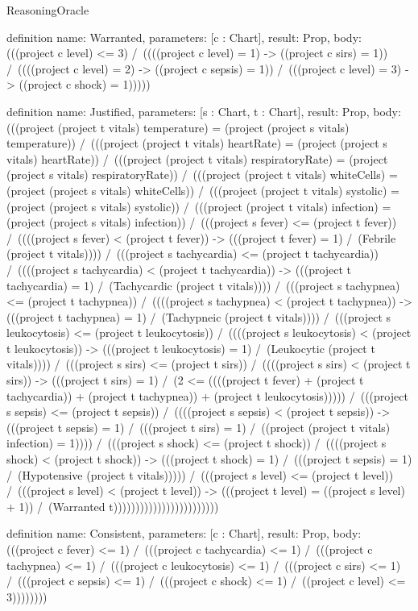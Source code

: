 \begin{lexlean}{ReasoningOracle}
\begin{semanticmodule}
definition{
  name: Warranted,
  parameters: [c : Chart],
  result: Prop,
  body: (((project c level) <= 3) /\ ((((project c level) = 1) -> ((project c sirs) = 1)) /\ ((((project c level) = 2) -> ((project c sepsis) = 1)) /\ (((project c level) = 3) -> ((project c shock) = 1)))))
}

definition{
  name: Justified,
  parameters: [s : Chart, t : Chart],
  result: Prop,
  body: (((project (project t vitals) temperature) = (project (project s vitals) temperature)) /\ (((project (project t vitals) heartRate) = (project (project s vitals) heartRate)) /\ (((project (project t vitals) respiratoryRate) = (project (project s vitals) respiratoryRate)) /\ (((project (project t vitals) whiteCells) = (project (project s vitals) whiteCells)) /\ (((project (project t vitals) systolic) = (project (project s vitals) systolic)) /\ (((project (project t vitals) infection) = (project (project s vitals) infection)) /\ (((project s fever) <= (project t fever)) /\ ((((project s fever) < (project t fever)) -> (((project t fever) = 1) /\ (Febrile (project t vitals)))) /\ (((project s tachycardia) <= (project t tachycardia)) /\ ((((project s tachycardia) < (project t tachycardia)) -> (((project t tachycardia) = 1) /\ (Tachycardic (project t vitals)))) /\ (((project s tachypnea) <= (project t tachypnea)) /\ ((((project s tachypnea) < (project t tachypnea)) -> (((project t tachypnea) = 1) /\ (Tachypneic (project t vitals)))) /\ (((project s leukocytosis) <= (project t leukocytosis)) /\ ((((project s leukocytosis) < (project t leukocytosis)) -> (((project t leukocytosis) = 1) /\ (Leukocytic (project t vitals)))) /\ (((project s sirs) <= (project t sirs)) /\ ((((project s sirs) < (project t sirs)) -> (((project t sirs) = 1) /\ (2 <= ((((project t fever) + (project t tachycardia)) + (project t tachypnea)) + (project t leukocytosis))))) /\ (((project s sepsis) <= (project t sepsis)) /\ ((((project s sepsis) < (project t sepsis)) -> (((project t sepsis) = 1) /\ (((project t sirs) = 1) /\ ((project (project t vitals) infection) = 1)))) /\ (((project s shock) <= (project t shock)) /\ ((((project s shock) < (project t shock)) -> (((project t shock) = 1) /\ (((project t sepsis) = 1) /\ (Hypotensive (project t vitals))))) /\ (((project s level) <= (project t level)) /\ (((project s level) < (project t level)) -> (((project t level) = ((project s level) + 1)) /\ (Warranted t))))))))))))))))))))))))
}

definition{
  name: Consistent,
  parameters: [c : Chart],
  result: Prop,
  body: (((project c fever) <= 1) /\ (((project c tachycardia) <= 1) /\ (((project c tachypnea) <= 1) /\ (((project c leukocytosis) <= 1) /\ (((project c sirs) <= 1) /\ (((project c sepsis) <= 1) /\ (((project c shock) <= 1) /\ ((project c level) <= 3))))))))
}


\end{semanticmodule}
\end{lexlean}
